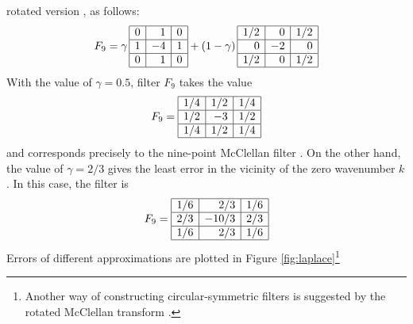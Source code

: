 rotated version \cite{cole}, as follows:
\begin{equation}
\label{eqn:new2}
F_9 = \gamma\, 
\begin{array}{|r|r|r|}
\hline
0 & 1 & 0 \\ \hline
1 & -4  & 1 \\ \hline
0 & 1 & 0  \\ \hline 
\end{array}
+ (1-\gamma)\,
\begin{array}{|r|r|r|}
\hline
1/2 & 0 & 1/2 \\ \hline
0 & -2  & 0 \\ \hline
1/2 & 0 & 1/2  \\ \hline 
\end{array}
\end{equation}
With the value of $\gamma=0.5$, filter $F_9$ takes the value
\begin{equation}
\label{eqn:mc}
F_9 = \begin{array}{|r|r|r|}
\hline
1/4 & 1/2 & 1/4 \\ \hline
1/2 & -3 & 1/2 \\ \hline
1/4 & 1/2 & 1/4  \\ \hline 
\end{array}
\end{equation}
and corresponds precisely to the nine-point McClellan filter
\cite{mc,GEO56.11.17781785}. On the other hand, the value of
$\gamma=2/3$ gives the least error in the vicinity of the zero
wavenumber $k$. In this case, the filter is
\begin{equation}
\label{eqn:my}
F_9 = \begin{array}{|r|r|r|}
\hline
1/6 & 2/3 & 1/6 \\ \hline
2/3 & -10/3 & 2/3 \\ \hline
1/6 & 2/3 & 1/6  \\ \hline 
\end{array}
\end{equation}
Errors of different approximations are plotted in Figure
\ref{fig:laplace}\footnote{Another way of constructing
  circular-symmetric filters is suggested by the rotated McClellan
  transform \cite{Biondi.sep.77.27}.}

